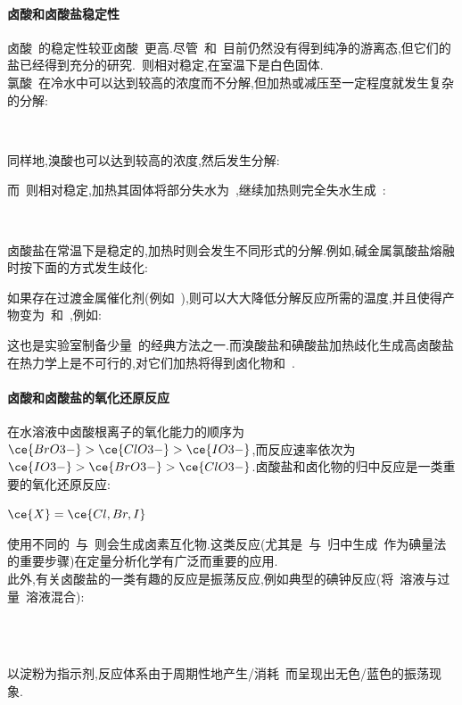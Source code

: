 \documentclass{ctexbook}
\begin{document}
\paragraph{卤酸和卤酸盐稳定性}
卤酸~的稳定性较亚卤酸~更高.尽管~和~目前仍然没有得到纯净的游离态,但它们的盐已经得到充分的研究.~则相对稳定,在室温下是白色固体.\\
\indent 氯酸~在冷水中可以达到较高的浓度而不分解,但加热或减压至一定程度就发生复杂的分解:
\begin{tightcenter}
    \\
\end{tightcenter}
同样地,溴酸也可以达到较高的浓度,然后发生分解:
\begin{tightcenter}
\end{tightcenter}
而~则相对稳定,加热其固体将部分失水为~,继续加热则完全失水生成~:
\begin{tightcenter}
    \\
\end{tightcenter}
\indent 卤酸盐在常温下是稳定的,加热时则会发生不同形式的分解.例如,碱金属氯酸盐熔融时按下面的方式发生歧化:
\begin{tightcenter}
\end{tightcenter}
如果存在过渡金属催化剂(例如~),则可以大大降低分解反应所需的温度,并且使得产物变为~和~,例如:
\begin{tightcenter}
\end{tightcenter}
这也是实验室制备少量~的经典方法之一.而溴酸盐和碘酸盐加热歧化生成高卤酸盐在热力学上是不可行的,对它们加热将得到卤化物和~.
\paragraph{卤酸和卤酸盐的氧化还原反应}
在水溶液中卤酸根离子的氧化能力的顺序为$\ce{BrO3-}>\ce{ClO3-}>\ce{IO3-}$,而反应速率依次为$\ce{IO3-}>\ce{BrO3-}>\ce{ClO3-}$.卤酸盐和卤化物的归中反应是一类重要的氧化还原反应:
\begin{tightcenter}
    \quad$\ce{X}=\ce{Cl, Br, I}$
\end{tightcenter}
使用不同的~与~则会生成卤素互化物.这类反应(尤其是~与~归中生成~作为碘量法的重要步骤)在定量分析化学有广泛而重要的应用.\\
\indent 此外,有关卤酸盐的一类有趣的反应是振荡反应,例如典型的碘钟反应\cite{Landolt1886}(将~溶液与过量~溶液混合):
\begin{tightcenter}
    \\
    \\
\end{tightcenter}
以淀粉为指示剂,反应体系由于周期性地产生/消耗~而呈现出无色/蓝色的振荡现象.
\end{document}
